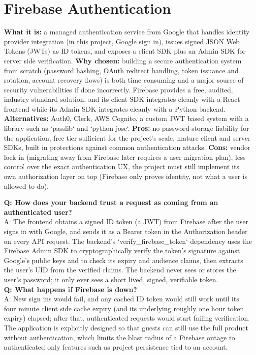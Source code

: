 \documentclass[11pt,a4paper]{report}
\begin{document}
\section{Firebase Authentication}
\textbf{What it is:} a managed authentication service from Google that handles identity provider integration (in this project, Google sign in), issues signed JSON Web Tokens (JWTs) as ID tokens, and exposes a client SDK plus an Admin SDK for server side verification.
\textbf{Why chosen:} building a secure authentication system from scratch (password hashing, OAuth redirect handling, token issuance and rotation, account recovery flows) is both time consuming and a major source of security vulnerabilities if done incorrectly. Firebase provides a free, audited, industry standard solution, and its client SDK integrates cleanly with a React frontend while its Admin SDK integrates cleanly with a Python backend.
\textbf{Alternatives:} Auth0, Clerk, AWS Cognito, a custom JWT based system with a library such as `passlib` and `python-jose`.
\textbf{Pros:} no password storage liability for the application, free tier sufficient for the project's scale, mature client and server SDKs, built in protections against common authentication attacks.
\textbf{Cons:} vendor lock in (migrating away from Firebase later requires a user migration plan), less control over the exact authentication UX, the project must still implement its own authorization layer on top (Firebase only proves identity, not what a user is allowed to do).

\begin{qabox}
\textbf{Q: How does your backend trust a request as coming from an authenticated user?} \\
A: The frontend obtains a signed ID token (a JWT) from Firebase after the user signs in with Google, and sends it as a Bearer token in the Authorization header on every API request. The backend's `verify_firebase_token` dependency uses the Firebase Admin SDK to cryptographically verify the token's signature against Google's public keys and to check its expiry and audience claims, then extracts the user's UID from the verified claims. The backend never sees or stores the user's password; it only ever sees a short lived, signed, verifiable token. \\[4pt]
\textbf{Q: What happens if Firebase is down?} \\
A: New sign ins would fail, and any cached ID token would still work until its four minute client side cache expiry (and its underlying roughly one hour token expiry) elapsed; after that, authenticated requests would start failing verification. The application is explicitly designed so that guests can still use the full product without authentication, which limits the blast radius of a Firebase outage to authenticated only features such as project persistence tied to an account.
\end{qabox}
\end{document}
